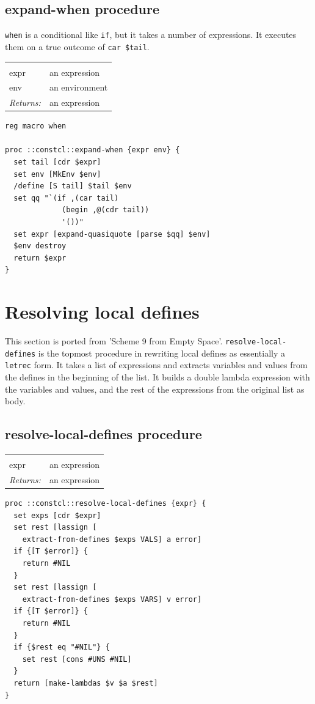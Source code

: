 \documentclass[twoside,9pt]{report}
\begin{document}
\subsection{expand-when procedure}
\label{expand-when-procedure}


\texttt{when} is a conditional like \texttt{if}, but it takes a number of expressions. It executes them on a true outcome of \texttt{car \$tail}.

\noindent\begin{tabular}{ |p{1.9cm} p{8cm}| }
\hline
\rowcolor[HTML]{CCCCCC} \multicolumn{2}{|l|}{\bf expand-when (internal)} \\
expr & an expression \\
env & an environment \\
\textit{Returns:} & an expression \\
\hline
\end{tabular}
\begin{lstlisting}
reg macro when

proc ::constcl::expand-when {expr env} {
  set tail [cdr $expr]
  set env [MkEnv $env]
  /define [S tail] $tail $env
  set qq "`(if ,(car tail)
             (begin ,@(cdr tail))
             '())"
  set expr [expand-quasiquote [parse $qq] $env]
  $env destroy
  return $expr
}
\end{lstlisting}
\section{Resolving local defines}
\label{resolving-local-defines}


This section is ported from 'Scheme 9 from Empty Space'. \texttt{resolve-local-defines} is the topmost procedure in rewriting local defines as essentially a \texttt{letrec} form. It takes a list of expressions and extracts variables and values from the defines in the beginning of the list. It builds a double lambda expression with the variables and values, and the rest of the expressions from the original list as body.

\subsection{resolve-local-defines procedure}
\label{resolve-local-defines-procedure}
\noindent\begin{tabular}{ |p{1.9cm} p{8cm}| }
\hline
\rowcolor[HTML]{CCCCCC} \multicolumn{2}{|l|}{\bf resolve-local-defines} \\
expr & an expression \\
\textit{Returns:} & an expression \\
\hline
\end{tabular}
\begin{lstlisting}
proc ::constcl::resolve-local-defines {expr} {
  set exps [cdr $expr]
  set rest [lassign [
    extract-from-defines $exps VALS] a error]
  if {[T $error]} {
    return #NIL
  }
  set rest [lassign [
    extract-from-defines $exps VARS] v error]
  if {[T $error]} {
    return #NIL
  }
  if {$rest eq "#NIL"} {
    set rest [cons #UNS #NIL]
  }
  return [make-lambdas $v $a $rest]
}
\end{lstlisting}
\end{document}
